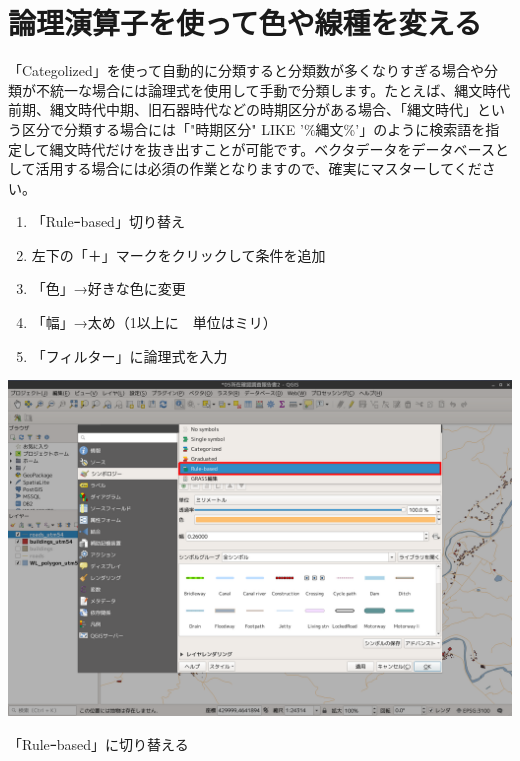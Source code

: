 \documentclass[14Q,twocolumn]{jsarticle}
\makeatletter
\newenvironment{figurehere}
  {\def\@captype{figure}}
  {}
\makeatother
\begin{document}
\section{論理演算子を使って色や線種を変える}
「Categolized」を使って自動的に分類すると分類数が多くなりすぎる場合や分類が不統一な場合には論理式を使用して手動で分類します。たとえば、縄文時代前期、縄文時代中期、旧石器時代などの時期区分がある場合、「縄文時代」という区分で分類する場合には「"時期区分" LIKE '\%縄文\%'」のように検索語を指定して縄文時代だけを抜き出すことが可能です。ベクタデータをデータベースとして活用する場合には必須の作業となりますので、確実にマスターしてください。

\begin{enumerate}
\item 「Ruleｰbased」切り替え
\item 左下の「＋」マークをクリックして条件を追加
\item 「色」→好きな色に変更
\item 「幅」→太め（1以上に　単位はミリ）
\item 「フィルター」に論理式を入力
\end{enumerate}

\newpage
\begin{figurehere}
\centering
\includegraphics[width=1\linewidth]{09.png}
\caption{「Ruleｰbased」に切り替える}
\end{figurehere}
\end{document}
